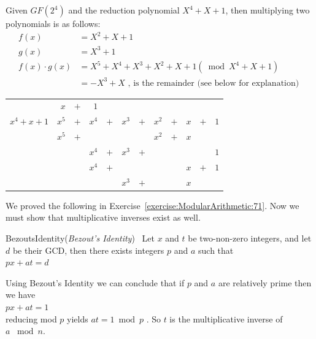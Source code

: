 \begin{eg} Given $GF(2^4)$ and the reduction polynomial $X^4 + X + 1$, then multiplying two polynomials is as follows:
\begin{align*}	
	f(x) &=  X^2 + X + 1\\
	g(x) &= X^3 + 1\\
 f(x) \cdot g(x) &= X^5 + X^4 + X^3 + X^2 + X + 1 (\bmod X^4 + X + 1)\\ 
	       &= - X^3 + X \text{ , is the remainder (see below for explanation) }
\end{align*}
\begin{center}
\begin{tabular}{rrcrcrcrcrcr}
        &  $x$  &  $+$  &      $1$         \\ \cline{2-12}
 \multicolumn{1}{r|}{$x^4 + x + 1$}
        &  $x^5$  &  $+$  &  $x^4$  &  $+$  & $ x^3$  &  $+$  &  $x^2$  &  $+$  & $ x$  &  $+$  &  $1$  \\
        & $x^5$   &  $+$  &       	&          &      	  &          &  $x^2$   & $+$  &  $x$     \\ \cline{2-12}
        &         &       &         $x^4$  & $+$   &  $ x^3$  &   $+$  &             &         &         &          &  $1$  \\
        &         &       &         $x^4$  &  $+$  &             &           &              &         &  $x$   & $+$  &  $1$   \\ \cline{4-12}
        &         &       &                    &          &   $x^3$ &    $+$  &              &         &  $x$    
\end{tabular}
\end{center}
\end{eg}
We proved the following in Exercise~\ref{exercise:ModularArithmetic:71}.
\newline \newline
Now we must show that multiplicative inverses exist as well.

\begin{prop}{BezoutsIdentity}(\emph{Bezout's Identity})~ Let $x$ and $t$ be two-non-zero integers, and let $d$ be their GCD, then there exists integers $p$ and $a$ such that\\
 \hspace*{\parindent} $px + at = d$
\end{prop}

\begin{corollary}
Using Bezout's Identity we can conclude that if $p$ and $a$ are relatively prime then we have\\
\hspace*{\parindent} $px + at = 1$ \\
reducing mod $p$ yields $at = 1 \bmod p$ .  So $t$ is the multiplicative inverse of\\
 $a$ $\bmod n$.
\end{corollary}

